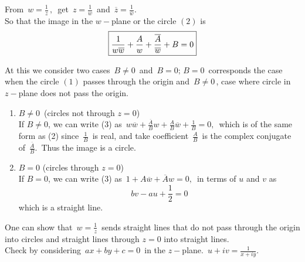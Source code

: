 \documentclass[11pt,a4paper]{article}
\theoremstyle{definition}
\begin{document}
From $\, w = \frac{1}{z}\,, \,$ get $\, z = \frac{1}{w}\,$ and $\, \overline{z} = \frac{1}{\overline{w}}$.\\

So that the image in the $w-$plane or the circle $(2)$ is 
\begin{equation}
\boxed{\frac{1}{w\overline{w}} + \frac{A}{w} + \frac{\overline{A}}{\overline{w}} + B = 0}\\
\end{equation}



At this we consider two cases $\, B\neq 0\,$ and $\, B = 0;\, B = 0\,$ corresponds the case when the circle $(1)$  passes through the origin and $\, B\neq 0\,$, case where circle in $z-$plane does not pass the origin.\\

\begin{enumerate}
\item $B\neq 0\,$ (circles not through $z = 0$)\\
If $B \neq 0$, we can write (3) as 
$\,\boxed{w\overline{w} + \frac{\overline{A}}{B}w + \frac{A}{B}\overline{w} + \frac{1}{B} = 0}, \,$ which is of the same form as (2) since $\, \frac{1}{B}\,$ is real, and take coefficient $\,\frac{A}{B}\,$ is  the complex conjugate of $\,\frac{\overline{A}}{B}.\,$ Thus the image is a circle.


\item $B = 0$ (circles through $ z = 0$)\\
If $B = 0$, we can write (3) as $\, 1 + A\overline{w} + \overline{A}w = 0,\,$ in terms of $u$ and $v$ as $$bv - au + \frac{1}{2} = 0$$ which is a straight line.\\
\end{enumerate}



One can show that $\, w = \frac{1}{z}\,$ sends straight lines that do not pass through the origin into circles and straight lines through $z = 0$ into straight lines.\\

Check by considering $\,ax + by + c = 0\, $ in the $z-$plane. $\, u + iv = \frac{1}{x + iy}$.\\\\\\
\end{document}
